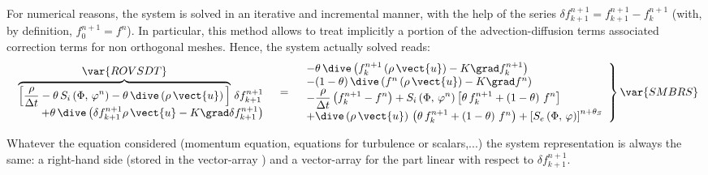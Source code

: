 For numerical reasons, the system is solved in an iterative and incremental
manner, with the help of the series $\delta f^{n+1}_{k+1}=f^{n+1}_{k+1}-f^{n+1}_{k}
$ (with, by definition, $f^{n+1}_0=f^{n}$). In particular, this method
allows to treat implicitly a portion of the advection-diffusion terms
associated correction terms for non orthogonal meshes. Hence, the system
actually solved reads:
\begin{equation}
\begin{array}{r c l}
\begin{array}{r}
\displaystyle\overbrace{
\left[ \frac{\rho }{\Delta t}-\theta \,S_{i} \left(\Phi
, \, \varphi ^{n}\right)-\theta \,\dive \left(\rho \,\vect{u} \right)\,\right] 
}^{%
\displaystyle \var{ROVSDT}} 
\,\delta f^{n+1}_{k+1}\\
+\theta \,\dive \left( \delta f^{n+1}_{k+1} \rho \,\vect{u} -
 K\grad \delta f^{n+1}_{k+1} \right)
\end{array}
&=& 
\left.
\begin{array}{l}
-\theta \,\dive \left( f^{n+1}_{k} \left(\rho \,\vect{u}\right)- K\grad f^{n+1}_{k}\right) \\
-(1-\theta )\,\dive \left( f^{n} \left(\rho \,\vect{u}\right) - K \grad f^{n} \right) \\
\displaystyle-\frac{\rho }{\Delta t} \left(f^{n+1}_{k}-f^{n} \right)
+S_{i}\left(\Phi , \, \varphi^{n}\right)
\left[ \theta \,f^{n+1}_{k}+ \left(1-\theta \right)\,f^{n}\right]  \\
+\dive \left(\rho \,\vect{u}\right)\,\left(\theta \,f^{n+1}_{k}+\left(1-\theta \right)\,f^{n}\right)+%
\left[ S_{e}\left(\Phi , \, \varphi \right)\right] ^{n+\theta _{S}}%
\end{array}%
\right\}\var{SMBRS}
\end{array}%
\end{equation}

Whatever the equation considered (momentum equation, equations for
turbulence or scalars,...) the system representation is always the same: a
right-hand side (stored in the vector-array ) and a vector-array %
 for the part linear with respect to $\delta f^{n+1}_{k+1}$.%

